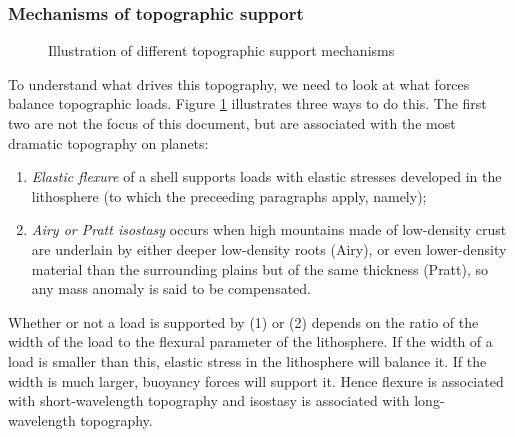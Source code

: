 \subsubsection{Mechanisms of topographic support}

\begin{figure}
  \centering
\caption{Illustration of different topographic support mechanisms}
\label{fig:topographic_support}
\end{figure}

To understand what drives this topography, we need to look at what forces balance topographic loads. Figure \ref{fig:topographic_support} illustrates three ways to do this. The first two are not the focus of this document, but are associated with the most dramatic topography on planets:
\begin{enumerate}
\item \emph{Elastic flexure} of a shell supports loads with elastic stresses developed in the lithosphere (to which the preceeding paragraphs apply, namely);
\item \emph{Airy or Pratt isostasy} occurs when high mountains made of low-density crust are underlain by either deeper low-density roots (Airy), or even lower-density material than the surrounding plains but of the same thickness (Pratt), so any mass anomaly is said to be compensated.
\end{enumerate}
Whether or not a load is supported by (1) or (2) depends on the ratio of the width of the load to the flexural parameter of the lithosphere.
If the width of a load is smaller than this, elastic stress in the lithosphere will balance it. If the width is much larger, buoyancy forces will support it. Hence flexure is associated with short-wavelength topography and isostasy is associated with long-wavelength topography. 

